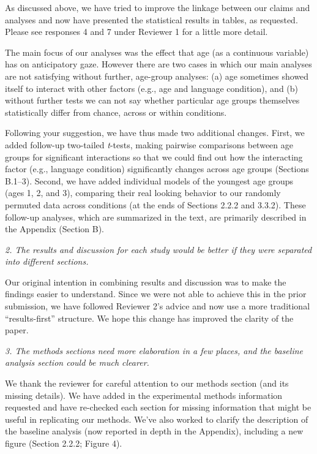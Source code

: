 \documentclass[11pt,a4paper]{letter} %
\begin{document}
\begin{letter}{}
\noindent As discussed above, we have tried to improve the linkage between our claims and analyses and now have presented the statistical results in tables, as requested. Please see responses 4 and 7 under Reviewer 1 for a little more detail. 

The main focus of our analyses was the effect that age (as a continuous variable) has on anticipatory gaze. However there are two cases in which our main analyses are not satisfying without further, age-group analyses: (a) age sometimes showed itself to interact with other factors (e.g., age and language condition), and (b) without further tests we can not say whether particular age groups themselves statistically differ from chance, across or within conditions. 

Following your suggestion, we have thus made two additional changes. First, we added follow-up two-tailed \textit{t}-tests, making pairwise comparisons between age groups for significant interactions so that we could find out how the interacting factor (e.g., language condition) significantly changes across age groups (Sections B.1--3). Second, we have added individual models of the youngest age groups (ages 1, 2, and 3), comparing their real looking behavior to our randomly permuted data across conditions (at the ends of Sections 2.2.2 and 3.3.2). These follow-up analyses, which are summarized in the text, are primarily described in the Appendix (Section B).

\smallskip

\noindent \textit{2. The results and discussion for each study would be better if they were separated into different sections.}

\noindent Our original intention in combining results and discussion was to make the findings easier to understand. Since we were not able to achieve this in the prior submission, we have followed Reviewer 2's advice and now use a more traditional ``results-first'' structure. We hope this change has improved the clarity of the paper. 

\smallskip

\noindent \textit{3. The methods sections need more elaboration in a few places, and the baseline analysis section could be much clearer.}

\noindent We thank the reviewer for careful attention to our methods section (and its missing details). We have added in the experimental methods information requested and have re-checked each section for missing information that might be useful in replicating our methods. We've also worked to clarify the description of the baseline analysis (now reported in depth in the Appendix), including a new figure (Section 2.2.2; Figure 4). 


\end{letter}
\end{document}
